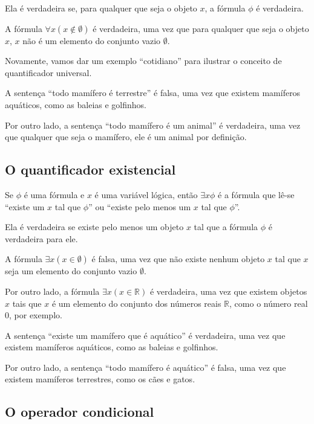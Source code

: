 Ela é verdadeira se, para qualquer que seja o objeto $x$, a fórmula $\phi$ é verdadeira.
\begin{example}
    A fórmula $\forall x (x\notin \emptyset)$ é verdadeira, uma vez que para qualquer que seja o objeto $x$, $x$ não é um elemento do conjunto vazio $\emptyset$.
\end{example}

Novamente, vamos dar um exemplo ``cotidiano'' para ilustrar o conceito de quantificador universal.

\begin{example}
    A sentença ``todo mamífero é terrestre'' é falsa, uma vez que existem mamíferos aquáticos, como as baleias e golfinhos.

    Por outro lado, a sentença ``todo mamífero é um animal'' é verdadeira, uma vez que qualquer que seja o mamífero, ele é um animal por definição.
\end{example}

\subsection{O quantificador existencial}
Se $\phi$ é uma fórmula e $x$ é uma variável lógica, então $\exists x \phi$ é a fórmula que lê-se ``existe um $x$ tal que $\phi$'' ou ``existe pelo menos um $x$ tal que $\phi$''.

Ela é verdadeira se existe pelo menos um objeto $x$ tal que a fórmula $\phi$ é verdadeira para ele.

\begin{example}
    A fórmula $\exists x (x\in \emptyset)$ é falsa, uma vez que não existe nenhum objeto $x$ tal que $x$ seja um elemento do conjunto vazio $\emptyset$.

    Por outro lado, a fórmula $\exists x (x\in \mathbb R)$ é verdadeira, uma vez que existem objetos $x$ tais que $x$ é um elemento do conjunto dos números reais $\mathbb R$, como o número real $0$, por exemplo.
\end{example}

\begin{example}
    A sentença ``existe um mamífero que é aquático'' é verdadeira, uma vez que existem mamíferos aquáticos, como as baleias e golfinhos.

    Por outro lado, a sentença ``todo mamífero é aquático'' é falsa, uma vez que existem mamíferos terrestres, como os cães e gatos.
\end{example}
\subsection{O operador condicional}

